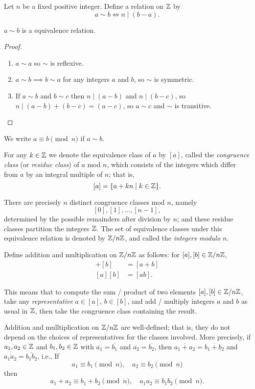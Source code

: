 \begin{example}
Let $n$ be a fixed positive integer. Define a relation on $\mathbb Z$ by
\[a\sim b\iff n\mid(b-a).\]
\begin{proposition*}
$a\sim b$ is a equivalence relation.
\end{proposition*}
\begin{proof} \
\begin{enumerate}[label=(\roman*)]
\item $a\sim a$ so $\sim$ is reflexive.
\item $a\sim b\implies b\sim a$ for any integers $a$ and $b$, so $\sim$ is symmetric.
\item If $a\sim b$ and $b\sim c$ then $n\mid(a-b)$ and $n\mid(b-c)$, so $n\mid(a-b)+(b-c)=(a-c)$, so $a\sim c$ and $\sim$ is transitive.
\end{enumerate}
\end{proof}

\begin{notation}
We write $a\equiv b\pmod n$ if $a\sim b$.
\end{notation}

\begin{notation}
For any $k\in\mathbb Z$ we denote the equivalence class of $a$ by $[a]$, called the \emph{congruence class} (or \emph{residue class}) of $a$ mod $n$, which consists of the integers which differ from $a$ by an integral multiple of $n$; that is,
\[[a]=\{a+kn\mid k\in\mathbb Z\}.\]
\end{notation}

There are precisely $n$ distinct congruence classes mod $n$, namely
\[[0],[1],\dots,[n-1],\]
determined by the possible remainders after division by $n$; and these residue classes partition the integers $\mathbb Z$. The set of equivalence classes under this equivalence relation is denoted by $\mathbb Z/n\mathbb Z$, and called the \emph{integers modulo $n$}.

Define addition and multiplication on $\mathbb Z/n\mathbb Z$ as follows: for $[a],[b]\in\mathbb Z/n\mathbb Z$,
\begin{align*}
[a]+[b]&=[a+b]\\
[a][b]&=[ab].
\end{align*}

This means that to compute the sum / product of two elements $[a],[b]\in\mathbb Z/n\mathbb Z$, take any \emph{representative} $a\in[a]$, $b\in[b]$, and add / multiply integers $a$ and $b$ as usual in $\mathbb Z$, then take the congruence class containing the result.

\begin{proposition*}
Addition and mulltiplication on $\mathbb Z/n\mathbb Z$ are well-defined; that is, they do not depend on the choices of representatives for the classes involved. More precisely, if $a_1,a_2\in\mathbb Z$ and $b_1,b_2\in\mathbb Z$ with $\overline{a_1}=\overline{b_1}$ and $\overline{a_2}=\overline{b_2}$, then $\overline{a_1+a_2}=\overline{b_1+b_2}$ and $\overline{a_1a_2}=\overline{b_1b_2}$, i.e., If
\[a_1\equiv b_1\pmod n,\quad a_2\equiv b_2\pmod n\]
then
\[a_1+a_2\equiv b_1+b_2\pmod n,\quad a_1a_2\equiv b_1b_2\pmod n.\]
\end{proposition*}


\end{example}
